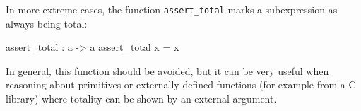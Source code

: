 In more extreme cases, the function \texttt{assert\_total} marks a
subexpression as always being total:

\begin{code}
assert_total : a -> a
assert_total x = x
\end{code}

\noindent
In general, this function should be avoided, but it can be very useful when
reasoning about primitives or externally defined functions (for example from
a C library) where totality can be shown by an external argument.




